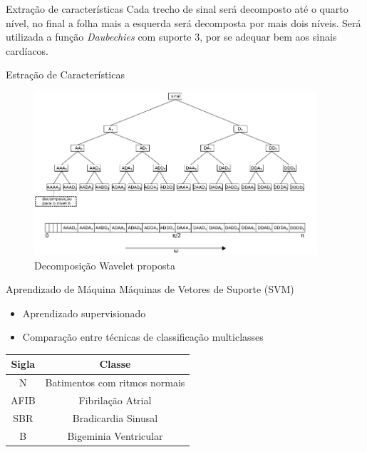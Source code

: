\documentclass[10pt]{beamer}
\begin{document}
\begin{frame}{Extração de características}
  Cada trecho de sinal será decomposto até o quarto nível, no final a folha 
  mais a esquerda será decomposta por mais dois níveis. Será utilizada a 
  função \textit{Daubechies} com suporte 3, por se adequar bem aos sinais cardíacos.
\end{frame}

\begin{frame}{Estração de Características}
  \begin{figure}[]
    \centering
    \includegraphics[width=10.5cm]{images/waveletProposal.png}
    \caption{Decomposição Wavelet proposta}
  \end{figure}
\end{frame}

\begin{frame}{Aprendizado de Máquina}
    Máquinas de Vetores de Suporte (SVM)
    \begin{itemize}
      \item Aprendizado supervisionado
      \item Comparação entre técnicas de classificação multiclasses
    \end{itemize}

    \begin{table}
      \centering
    \begin{tabular}{|c|c|}
      \hline
      Sigla   & Classe                        \\ \hline
      N       & Batimentos com ritmos normais \\ \hline
      AFIB    & Fibrilação Atrial             \\ \hline
      SBR     & Bradicardia Sinusal           \\ \hline
      B       & Bigeminia Ventricular         \\ \hline

    \end{tabular}
  \end{table}
\end{frame}
\end{document}

